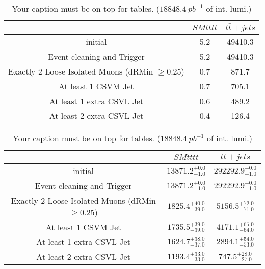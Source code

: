 \documentclass{article}
\begin{document}
\begin{table}
\caption{Your caption must be on top for tables. ($18848.4~pb^{-1}$ of int. lumi.)}
\label{tab:}
\centering
\begin{tabular}{|c|cc|}
\toprule
&$SM tttt$	&$t\bar{t}+jets$	\\

\midrule
initial&	5.2	&49410.3	\\

Event cleaning and Trigger&	5.2	&49410.3	\\

Exactly 2 Loose Isolated Muons (dRMin $\geq 0.25$)&	0.7	&871.7	\\

At least 1 CSVM Jet&	0.7	&705.1	\\

At least 1 extra CSVL Jet&	0.6	&489.2	\\

At least 2 extra CSVL Jet&	0.4	&126.4	\\

\bottomrule
\end{tabular}
\end{table}
\begin{table}
\caption{Your caption must be on top for tables. ($18848.4~pb^{-1}$ of int. lumi.)}
\label{tab:}
\centering
\begin{tabular}{|c|cc|}
\toprule
&$SM tttt$	&$t\bar{t}+jets$	\\

\midrule
initial&	$13871.2^{+0.0}_{-1.0}$	&$292292.9^{+0.0}_{-1.0}$	\\

Event cleaning and Trigger&	$13871.2^{+0.0}_{-1.0}$	&$292292.9^{+0.0}_{-1.0}$	\\

Exactly 2 Loose Isolated Muons (dRMin $\geq 0.25$)&	$1825.4^{+40.0}_{-39.0}$	&$5156.5^{+72.0}_{-71.0}$	\\

At least 1 CSVM Jet&	$1735.5^{+39.0}_{-39.0}$	&$4171.1^{+65.0}_{-64.0}$	\\

At least 1 extra CSVL Jet&	$1624.7^{+38.0}_{-37.0}$	&$2894.1^{+54.0}_{-53.0}$	\\

At least 2 extra CSVL Jet&	$1193.4^{+33.0}_{-33.0}$	&$747.5^{+28.0}_{-27.0}$	\\

\bottomrule
\end{tabular}
\end{table}
\end{document}
